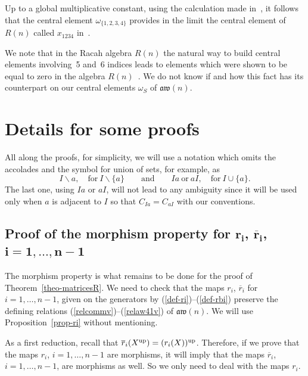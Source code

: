 \documentclass[pdftex]{sigma}
\numberwithin{equation}{section}
\theoremstyle{definition}
\newcommand{\rb}{\overline{r}}
\newcommand{\aw}{\mathfrak{aw}(n)}
\begin{document}
 Up to a global multiplicative constant, using the calculation made in~\cite{CFR}, it follows that the central element $\omega_{\{1,2,3,4\}}$ provides in the limit the central element of $R(n)$ called $x_{1234}$ in~\cite{CFR, CGPV}.

 We note that in the Racah algebra $R(n)$ the natural way to build central elements involving~5 and~6 indices leads to elements which were shown to be equal to zero in the algebra $R(n)$~\cite{CGPV}. We do not know if and how this fact has its counterpart on our central elements $\omega_S$ of $\aw$.

\appendix

\section{Details for some proofs}\label{sec-appendix}

All along the proofs, for simplicity, we will use a notation which omits the accolades and the symbol for union of sets, for example, as
\[I\backslash a, \quad \text{for}\ I\backslash\{a\}\qquad \text{and}\qquad Ia\ \text{or}\ aI, \quad \text{for}\ I\cup\{a\} .\]
The last one, using $Ia$ or $aI$, will not lead to any ambiguity since it will be used only when $a$ is adjacent to $I$ so that $C_{Ia}=C_{aI}$ with our conventions.

\subsection[Proof of the morphism property for r\_i, bar r\_i, i=1,...,n-1]{Proof of the morphism property for $\boldsymbol{r_i}$, $\boldsymbol{\rb_i}$, $\boldsymbol{i=1,\ldots,n-1}$}
The morphism property is what remains to be done for the proof of Theorem~\ref{theo-matricesR}. We need to check that the maps $r_i$, $\rb_i$ for $i=1,\dots,n-1$, given on the generators by (\ref{def-ri})--(\ref{def-rbi}) preserve the defining relations (\ref{relcommv})--(\ref{relaw41v}) of $\aw$. We will use Proposition~\ref{prop-ri} without mentioning.

As a first reduction, recall that $\rb_i(X^{\rm up})=(r_i(X))^{\rm up}$. Therefore, if we prove that the maps $r_i$, $i=1,\dots,n-1$ are morphisms, it will imply that the maps $\rb_i$, $i=1,\dots,n-1$, are morphisms as well. So we only need to deal with the maps $r_i$.
\end{document}
